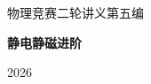 \documentclass[11pt,openany,fontset=fandol]{ctexbook}
\begin{document}
\frontmatter
\begin{titlepage}
\centering\vspace*{30mm}
{\Large 物理竞赛二轮讲义\quad 第五编\par}\vspace{8mm}

{\Huge\bfseries 静电静磁进阶\par}
\vspace{12mm}{\Large 物理竞赛二轮讲义\par}
\vspace{10mm}{\large 第一讲至第四讲\par}
\vfill{\large 2026\par}
\end{titlepage}
\tableofcontents
\mainmatter




\end{document}
